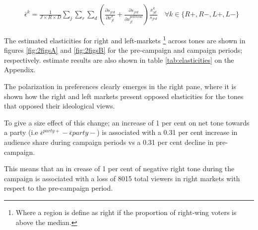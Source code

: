 \documentclass[12pt]{article}
\begin{document}
	\begin{equation}\label{eq:elasticities}
		\begin{aligned}
			& \bar{\epsilon}^k= \frac{1}{J\times R \times D}\sum_{j}\sum_{r} \sum_{d} \left(\frac{\partial s_{jrd}}{\partial x_{jt}^k} +  \frac{\partial s_{jrd}}{\partial x_{jt}^{political}} \right) \frac{x_{jd}^k}{s_{jrd}}    \quad \forall k \in \{R+,R-,L+,L-\}
		\end{aligned}
	\end{equation}             
	
	
The estimated elasticities for right and left-markets \footnote{Where a region is define as right if the proportion of right-wing voters is above the median. } across tones are shown in figures \ref{fig:2figsA} and \ref{fig:2figsB} for the pre-campaign and campaign periods; respectively. estimate results are also shown in table \ref{tab:elasticities} on the Appendix. 

The polarization in preferences clearly emerges in the right pane, where it is shown how the right and left markets present opposed elasticities for the tones that opposed their ideological views. 

To give a size effect of this change; an increase of 1 per cent on net tone towards a party (i.e $ \bar{\epsilon}^{party+}- \bar{\epsilon}{party-}$) is associated with a 0.31 per cent increase in audience share during campaign periods vs a 0.31 per cent decline in pre-campaign.

This means that an in crease of 1 per cent of negative right tone during the campaign is associated with a loss of 8015 total viewers in right markets with respect to the pre-campaign period. 
\end{document}
